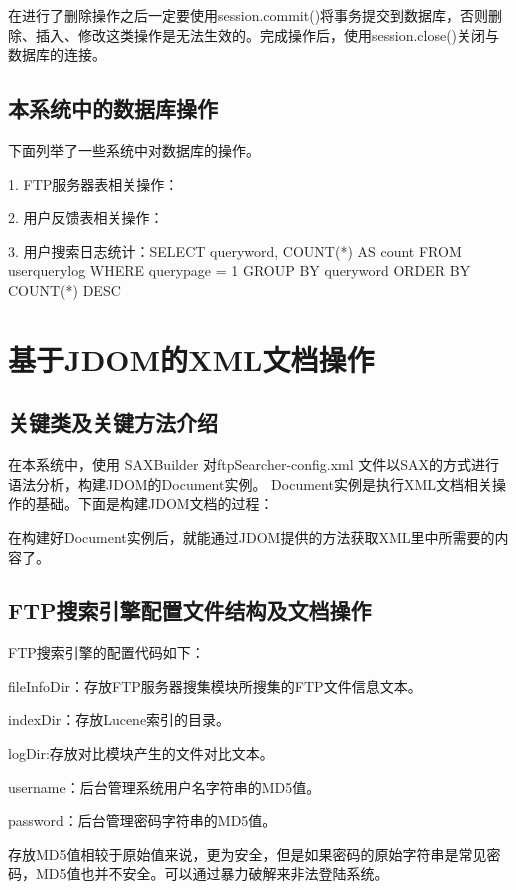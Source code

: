 

在进行了删除操作之后一定要使用session.commit()将事务提交到数据库，否则删除、插入、修改这类操作是无法生效的。完成操作后，使用session.close()关闭与数据库的连接。
\subsection{本系统中的数据库操作}
下面列举了一些系统中对数据库的操作。

1. FTP服务器表相关操作：



2. 用户反馈表相关操作：



3. 用户搜索日志统计：SELECT queryword, COUNT(*) AS count
		             FROM userquerylog WHERE querypage = 1 
		             GROUP BY queryword ORDER BY COUNT(*) DESC
\section{基于JDOM的XML文档操作}
\subsection{关键类及关键方法介绍}
在本系统中，使用 SAXBuilder 对ftpSearcher-config.xml 文件以SAX的方式进行语法分析，构建JDOM的Document实例。 Document实例是执行XML文档相关操作的基础。下面是构建JDOM文档的过程：



在构建好Document实例后，就能通过JDOM提供的方法获取XML里中所需要的内容了。

\subsection{FTP搜索引擎配置文件结构及文档操作}
FTP搜索引擎的配置代码如下：



fileInfoDir：存放FTP服务器搜集模块所搜集的FTP文件信息文本。

indexDir：存放Lucene索引的目录。

logDir:存放对比模块产生的文件对比文本。

username：后台管理系统用户名字符串的MD5值。

password：后台管理密码字符串的MD5值。

存放MD5值相较于原始值来说，更为安全，但是如果密码的原始字符串是常见密码，MD5值也并不安全。可以通过暴力破解来非法登陆系统。

